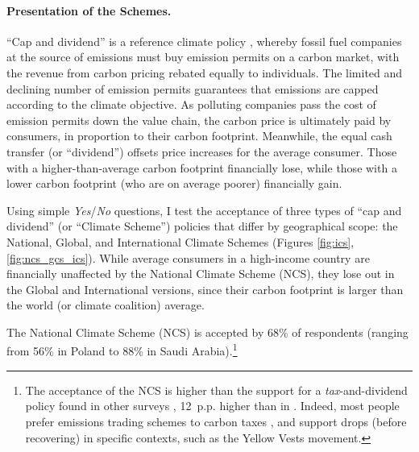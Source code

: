 \documentclass[12pt,english]{article}
\begin{document}
\begin{bibunit}
\paragraph{Presentation of the Schemes.} ``Cap and dividend'' is a reference climate policy \citep{grubb_greenhouse_1990,bertram_tradeable_1992,baer_equity_2000,barnes_creating_2008,blanchard_major_2021}, %
whereby fossil fuel companies at the source of emissions must buy emission permits on a carbon market, with the revenue from carbon pricing rebated equally to individuals. The limited and declining number of emission permits guarantees that emissions are capped according to the climate objective. As polluting companies pass the cost of emission permits down the value chain, the carbon price is ultimately paid by consumers, in proportion to their carbon footprint. Meanwhile, the equal cash transfer (or ``dividend'') offsets price increases for the average consumer. Those with a higher-than-average carbon footprint financially lose, while those with a lower carbon footprint (who are on average poorer) financially gain. 

Using simple \textit{Yes}/\textit{No} questions, I test the acceptance of three types of ``cap and dividend'' (or ``Climate Scheme'') policies that differ by geographical scope: the National, Global, and International Climate Schemes (Figures \ref{fig:ics}, \ref{fig:ncs_gcs_ics}). While average consumers in a high-income country are financially unaffected by the National Climate Scheme (NCS), they lose out in the Global and International versions, since their carbon footprint is larger than the world (or climate coalition) average. %

The National Climate Scheme (NCS) 
is accepted by 68\% of respondents (ranging from 56\% in Poland to 88\% in Saudi Arabia).\footnote{The acceptance of the NCS is higher than the support for a \textit{tax}-and-dividend policy found in other surveys \citep{douenne_yellow_2022,mildenberger_limited_2022}, 12~p.p. higher than in \cite{dechezlepretre_fighting_2025}. Indeed, most people prefer emissions trading schemes to carbon taxes \citep{funke_prices_2025}, and support drops (before recovering) in specific contexts, such as the Yellow Vests movement.} 


\end{bibunit}
\end{document}
